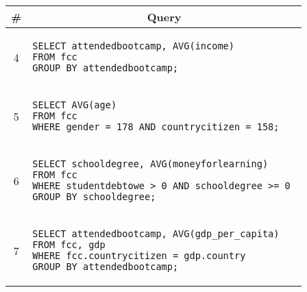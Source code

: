 \begin{tabular}{cl}
\toprule
\# & \multicolumn{1}{c}{Query} \\
\midrule
4 & 
\begin{minipage}{6in}
\begin{lstlisting}[breaklines]
SELECT attendedbootcamp, AVG(income) 
FROM fcc 
GROUP BY attendedbootcamp;
\end{lstlisting}
\end{minipage}{queryno} \label{q4} \\
5 & 
\begin{minipage}{6in}
\begin{lstlisting}[breaklines]
SELECT AVG(age) 
FROM fcc 
WHERE gender = 178 AND countrycitizen = 158;
\end{lstlisting}
\end{minipage}{queryno} \label{q5} \\
6 & 
\begin{minipage}{6in}
\begin{lstlisting}[breaklines]
SELECT schooldegree, AVG(moneyforlearning) 
FROM fcc 
WHERE studentdebtowe > 0 AND schooldegree >= 0 
GROUP BY schooldegree;
\end{lstlisting}
\end{minipage}{queryno} \label{q6}\\
7 & 
\begin{minipage}{6in}
\begin{lstlisting}[breaklines]
SELECT attendedbootcamp, AVG(gdp_per_capita) 
FROM fcc, gdp 
WHERE fcc.countrycitizen = gdp.country 
GROUP BY attendedbootcamp;
\end{lstlisting}
\end{minipage}{queryno} \label{q7}\\
\bottomrule
\end{tabular}
